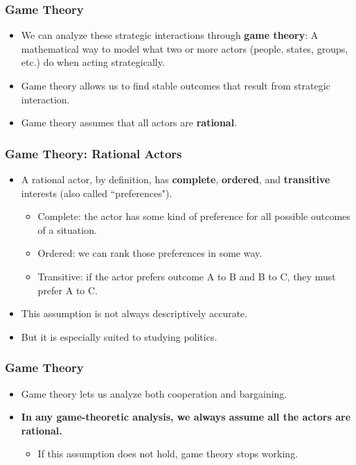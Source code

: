 \documentclass{beamer}
\begin{document}
 \begin{frame} 
 \frametitle{\LARGE{Game Theory}}
    \begin{itemize}
         \item We can analyze these strategic interactions through \textbf{game theory}: A mathematical way to model what two or more actors (people, states, groups, etc.) do when acting strategically. \pause  
         \item Game theory allows us to find stable outcomes that result from strategic interaction. \pause 
         \item Game theory assumes that all actors are \textbf{rational}.
     \end{itemize}
 \end{frame}

\begin{frame} 
	\frametitle{\LARGE{Game Theory: Rational Actors}}
	\begin{itemize}
		\item A rational actor, by definition, has \textbf{complete}, \textbf{ordered}, and \textbf{transitive} interests (also called ``preferences"). \pause 
		\begin{itemize}
			\item Complete: the actor has some kind of preference for all possible outcomes of a situation. \pause
			\item Ordered: we can rank those preferences in some way. \pause
			\item Transitive: if the actor prefers outcome A to B and B to C, they must prefer A to C. \pause 
		\end{itemize}
		\item This assumption is not always descriptively accurate. \pause 
		\item But it is especially suited to studying politics. 
	\end{itemize}
\end{frame}

 \begin{frame} 
	\frametitle{\LARGE{Game Theory}}
	\begin{itemize}
		\item Game theory lets us analyze both cooperation and bargaining. \pause
		\item \textbf{In any game-theoretic analysis, we always assume all the actors are rational.}
		\begin{itemize}
			\item If this assumption does not hold, game theory stops working.
		\end{itemize}
	\end{itemize}
\end{frame}
\end{document}
